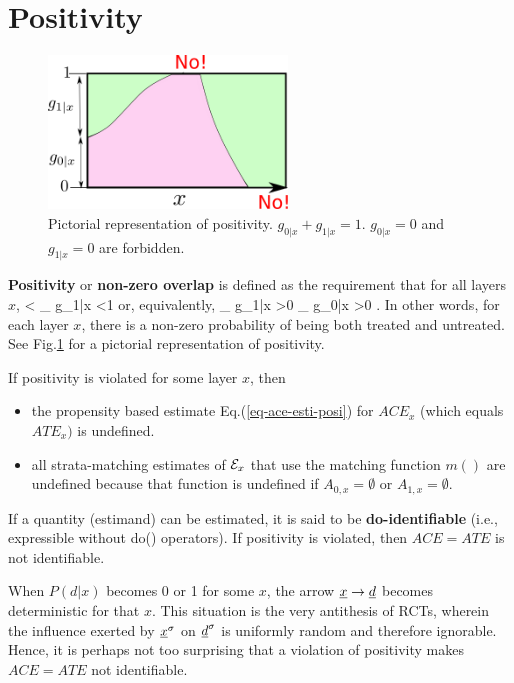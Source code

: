\section{Positivity}

\begin{figure}[h!]
\centering
\includegraphics[width=2.5in]
{pot-out/po-positivity}
\caption{Pictorial
representation of positivity.
$g_{0|x}+g_{1|x}=1$.
$g_{0|x}=0$
and
$g_{1|x}=0$ are forbidden.} 
\label{fig-po-positivity}
\end{figure}



{\bf Positivity} 
or {\bf
non-zero overlap} is defined as the
requirement that for all layers $x$,
<
_{
g_{1|x}}
<1
\eeq
or, equivalently, 
\beq
{}_
{g_{1|x}}
>0
_
{g_{0|x}}
>0
\;.
\eeq
In other words, 
for each layer $x$,
there is
a non-zero
probability of being both treated 
and untreated.
See Fig.\ref{fig-po-positivity} for a pictorial 
representation of positivity.

If positivity is violated 
for some layer $x$, then
\begin{itemize}
\item
the propensity based estimate
Eq.(\ref{eq-ace-esti-posi}) for 
 $ACE_x$
(which equals ${ATE}_x)$
is undefined. 
\item
all strata-matching estimates of
${\cal E}_x$
that use the matching function 
$m()$
are undefined
because that function 
is undefined if $A_{0,x}=\emptyset$
or $A_{1,x}=\emptyset$.
\end{itemize}
If a quantity (estimand)
 can be estimated,
it is said to be {\bf do-identifiable}
 (i.e., expressible without do() operators).
If positivity is violated,
 then
 $ACE=ATE$ is not identifiable.

 

When 
$P(d|x)$ 
becomes 0 or 1 for some $x$,
the arrow
${\underline{x}}\rightarrow{\underline{d}}$
becomes deterministic
for that $x$.
This situation
is
the very 
antithesis
of RCTs,
wherein 
the influence
exerted by ${\underline{x}}^\sigma$ on 
${\underline{d}}^\sigma$ is uniformly
random and therefore ignorable.
Hence, it is perhaps 
not too surprising
that a violation
of positivity makes
$ACE=ATE$
not identifiable.



